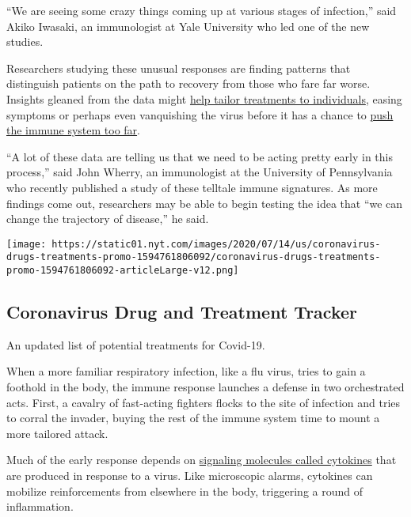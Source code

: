 ``We are seeing some crazy things coming up at various stages of
infection,'' said Akiko Iwasaki, an immunologist at Yale University who
led one of the new studies.

Researchers studying these unusual responses are finding patterns that
distinguish patients on the path to recovery from those who fare far
worse. Insights gleaned from the data might
\href{https://www.nytimes.com/interactive/2020/science/coronavirus-drugs-treatments.html}{help
tailor treatments to individuals}, easing symptoms or perhaps even
vanquishing the virus before it has a chance to
\href{https://www.nytimes.com/2020/04/01/health/coronavirus-cytokine-storm-immune-system.html}{push
the immune system too far}.

``A lot of these data are telling us that we need to be acting pretty
early in this process,'' said John Wherry, an immunologist at the
University of Pennsylvania who recently published a study of these
telltale immune signatures. As more findings come out, researchers may
be able to begin testing the idea that ``we can change the trajectory of
disease,'' he said.

\href{https://www.nytimes.com/interactive/2020/science/coronavirus-drugs-treatments.html}{}

\texttt{[image: https://static01.nyt.com/images/2020/07/14/us/coronavirus-drugs-treatments-promo-1594761806092/coronavirus-drugs-treatments-promo-1594761806092-articleLarge-v12.png]}

\hypertarget{coronavirus-drug-and-treatment-tracker}{%
\subsection{Coronavirus Drug and Treatment
Tracker}\label{coronavirus-drug-and-treatment-tracker}}

An updated list of potential treatments for Covid-19.

When a more familiar respiratory infection, like a flu virus, tries to
gain a foothold in the body, the immune response launches a defense in
two orchestrated acts. First, a cavalry of fast-acting fighters flocks
to the site of infection and tries to corral the invader, buying the
rest of the immune system time to mount a more tailored attack.

Much of the early response depends on
\href{https://www.nytimes.com/2020/04/01/health/coronavirus-cytokine-storm-immune-system.html}{signaling
molecules called cytokines} that are produced in response to a virus.
Like microscopic alarms, cytokines can mobilize reinforcements from
elsewhere in the body, triggering a round of inflammation.

